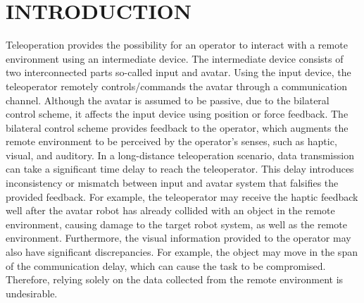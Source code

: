\documentclass[letterpaper, 10 pt, conference]{ieeeconf}  %
\begin{document}
\section{INTRODUCTION}
\label{section:intro}
Teleoperation provides the possibility for an operator to interact with a remote environment using an intermediate device. The intermediate device consists of two interconnected parts so-called input and avatar. Using the input device, the teleoperator remotely controls/commands the avatar through a communication channel. Although the avatar is assumed to be passive, due to the bilateral control scheme, it affects the input device using position or force feedback. The bilateral control scheme provides feedback to the operator, which augments the remote environment to be perceived by the operator's senses, such as haptic, visual, and auditory.
In a long-distance teleoperation scenario, data transmission can take a significant time delay to reach the teleoperator. This delay introduces inconsistency or mismatch between input and avatar system that falsifies the provided feedback. For example, the teleoperator may receive the haptic feedback well after the avatar robot has already collided with an object in the remote environment, causing damage to the target robot system, as well as the remote environment. Furthermore, the visual information provided to the operator may also have significant discrepancies. For example, the object may move in the span of the communication delay, which can cause the task to be compromised. Therefore, relying solely on the data collected from the remote environment is undesirable.
\end{document}
